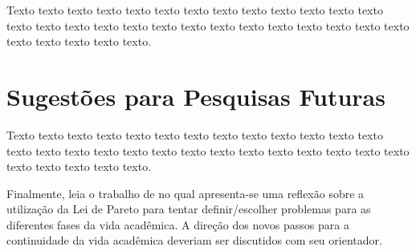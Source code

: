 Texto texto texto texto texto texto texto texto texto texto texto texto texto
texto texto texto texto texto texto texto texto texto texto texto texto texto
texto texto texto texto texto texto. 

\section{Sugestões para Pesquisas Futuras} 

Texto texto texto texto texto texto texto texto texto texto texto texto texto
texto texto texto texto texto texto texto texto texto texto texto texto texto
texto texto texto texto texto texto.

Finalmente, leia o trabalho de \citet{alon09:how} no qual apresenta-se
uma reflexão sobre a utilização da Lei de Pareto para tentar definir/escolher
problemas para as diferentes fases da vida acadêmica.  A direção dos novos
passos para a continuidade da vida acadêmica deveriam ser discutidos com seu
orientador.

